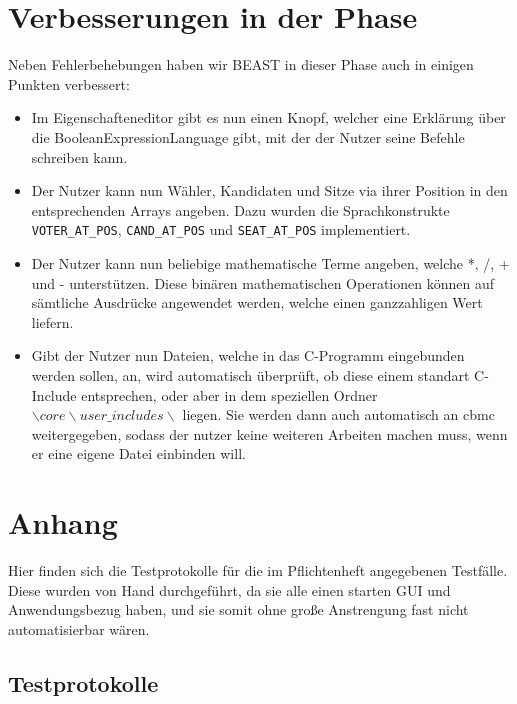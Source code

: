 \documentclass[a4paper]{scrreprt}
\begin{document}
\chapter{Verbesserungen in der Phase}
Neben Fehlerbehebungen haben wir BEAST in dieser Phase auch in einigen Punkten
verbessert:

\begin{itemize}
  \item Im Eigenschafteneditor gibt es nun einen Knopf, welcher eine Erklärung
  über die BooleanExpressionLanguage gibt, mit der der Nutzer seine Befehle
  schreiben kann.
  \item Der Nutzer kann nun Wähler, Kandidaten und Sitze via ihrer Position in den entsprechenden Arrays angeben. Dazu wurden die Sprachkonstrukte \verb!VOTER_AT_POS!, \verb!CAND_AT_POS! und \verb!SEAT_AT_POS! implementiert.
  \item Der Nutzer kann nun beliebige mathematische Terme angeben, welche *, /, + und - unterstützen. Diese binären mathematischen Operationen können auf sämtliche Ausdrücke angewendet werden, welche einen ganzzahligen Wert liefern.
  \item Gibt der Nutzer nun Dateien, welche in das C-Programm eingebunden werden
  sollen, an, wird automatisch überprüft, ob diese einem standart C-Include
  entsprechen, oder aber in dem speziellen Ordner $\backslash core \backslash
  user\_includes \backslash$ liegen. Sie werden dann auch automatisch an cbmc
  weitergegeben, sodass der nutzer keine weiteren Arbeiten machen muss, wenn er
  eine eigene Datei einbinden will.
\end{itemize}

\chapter{Anhang}

Hier finden sich die Testprotokolle für die im Pflichtenheft angegebenen
Testfälle. Diese wurden von Hand durchgeführt, da sie alle einen starten GUI und
Anwendungsbezug haben, und sie somit ohne große Anstrengung fast nicht
automatisierbar wären.

\section{Testprotokolle} 















\end{document}
